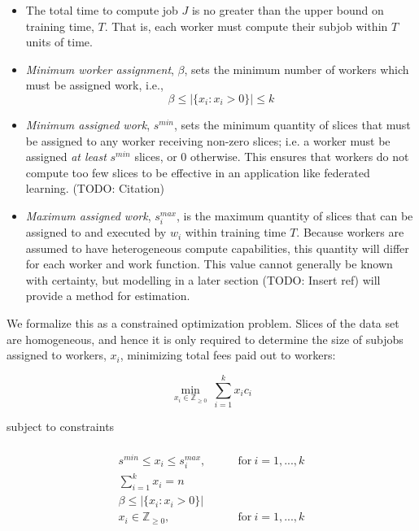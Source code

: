 \documentclass[../mthe-493-final-project.tex]{subfiles}
\begin{document}
    \begin{itemize}
        \item The total time to compute job $J$ is no greater than the upper bound on training time, $T$. That is, each worker must compute their subjob within $T$ units of time.
        \item \textit{Minimum worker assignment}, $\beta$, sets the minimum number of workers which must be assigned work, i.e.,
              \[\beta \leq \vert \{x_i : x_i > 0\} \vert \leq k\]
        \item \textit{Minimum assigned work}, $s^{min}$, sets the minimum quantity of slices that must be assigned to any worker receiving non-zero slices; i.e. a worker must be assigned \textit{at least} $s^{min}$ slices, or 0 otherwise. This ensures that workers do not compute too few slices to be effective in an application like federated learning. (TODO: Citation)
        \item \textit{Maximum assigned work}, $s^{max}_i$, is the maximum quantity of slices that can be assigned to and executed by $w_i$ within training time $T$. Because workers are assumed to have heterogeneous compute capabilities, this quantity will differ for each worker and work function. This value cannot generally be known with certainty, but modelling in a later section (TODO: Insert ref) will provide a method for estimation.
    \end{itemize}


    We formalize this as a constrained optimization problem. Slices of the data set are homogeneous, and hence it is only required to determine the size of subjobs assigned to workers, $x_i$, minimizing total fees paid out to workers:

    \[ \min_{x_i \in \mathbb{Z}_{\geq 0}} \ \sum_{i=1}^k x_i c_i \]

    subject to constraints

    \begin{align*}
        \\
        s^{min} \leq x_i \leq s^{max}_i, &\qquad \text{for} \ i=1,...,k \\
        \sum_{i = 1}^k x_i = n                                          \\
        \beta \leq \vert \{x_i : x_i > 0\} \vert                        \\
        x_i \in \mathbb{Z}_{\geq 0},     &\qquad \text{for} \ i=1,...,k
    \end{align*}
\end{document}
